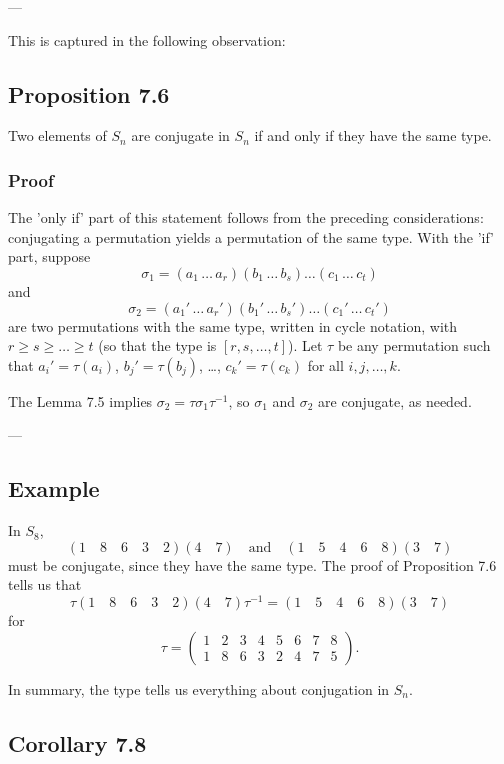 ---

This is captured in the following observation:

\subsection*{Proposition 7.6}

Two elements of $S_n$ are conjugate in $S_n$ if and only if they have the same type.

\subsubsection*{Proof}

The 'only if' part of this statement follows from the preceding considerations: conjugating a permutation yields a permutation of the same type.
With the 'if' part, suppose
$$ \sigma_1 = (a_1 \, \dots \, a_r)(b_1 \, \dots \, b_s) \dots (c_1 \, \dots \, c_t) $$
and
$$ \sigma_2 = (a_1' \, \dots \, a_r')(b_1' \, \dots \, b_s') \dots (c_1' \, \dots \, c_t') $$
are two permutations with the same type, written in cycle notation, with $r \geq s \geq \dots \geq t$ (so that the type is $[r, s, \dots, t]$). Let $\tau$ be any permutation such that $a_i' = \tau(a_i)$, $b_j' = \tau(b_j)$, \dots, $c_k' = \tau(c_k)$ for all $i, j, \dots, k$.

The Lemma 7.5 implies $\sigma_2 = \tau \sigma_1 \tau^{-1}$, so $\sigma_1$ and $\sigma_2$ are conjugate, as needed.

---

\subsection*{Example}

In $S_8$,
$$ (1 \quad 8 \quad 6 \quad 3 \quad 2)(4 \quad 7) \quad \text{and} \quad (1 \quad 5 \quad 4 \quad 6 \quad 8)(3 \quad 7) $$
must be conjugate, since they have the same type. The proof of Proposition 7.6 tells us that
$$ \tau (1 \quad 8 \quad 6 \quad 3 \quad 2)(4 \quad 7) \tau^{-1} = (1 \quad 5 \quad 4 \quad 6 \quad 8)(3 \quad 7) $$
for
$$ \tau = \begin{pmatrix} 1 & 2 & 3 & 4 & 5 & 6 & 7 & 8 \\ 1 & 8 & 6 & 3 & 2 & 4 & 7 & 5 \end{pmatrix}. $$

In summary, the type tells us everything about conjugation in $S_n$.

\subsection*{Corollary 7.8}

